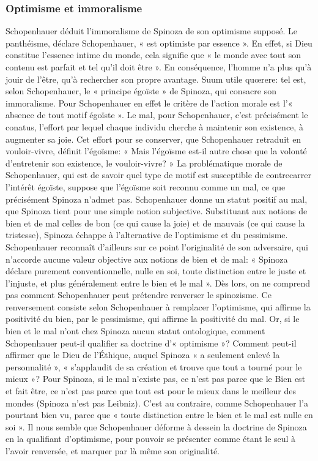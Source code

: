 \subsubsection{Optimisme et immoralisme}

Schopenhauer déduit l’immoralisme de Spinoza de son optimisme supposé. Le panthéisme, déclare
Schopenhauer, « est optimiste par essence ». En effet, si Dieu constitue l’essence intime
du monde, cela signifie que « le monde avec tout son contenu est parfait et tel qu’il doit être ». En conséquence, l’homme n’a plus qu’à jouir de l’être, qu’à rechercher son propre avantage.
Suum utile quœrere: tel est, selon Schopenhauer, le « principe égoïste » de Spinoza, qui
consacre son immoralisme. Pour Schopenhauer en effet le critère de l’action morale est l’« absence de tout
motif égoïste ».
Le mal, pour Schopenhauer, c’est précisément le conatus, l’effort par lequel chaque individu cherche à
maintenir son existence, à augmenter sa joie. Cet effort pour se conserver, que Schopenhauer retraduit en
vouloir-vivre, définit l’égoïsme: « Mais l’égoïsme est-il autre chose que la volonté d’entretenir son existence,
le vouloir-vivre? » La problématique morale de Schopenhauer, qui est de savoir quel type de motif est
susceptible de contrecarrer l’intérêt égoïste, suppose que l’égoïsme soit reconnu comme un mal, ce que
précisément Spinoza n’admet pas. Schopenhauer donne un statut positif au mal, que Spinoza tient pour une
simple notion subjective. Substituant aux notions de bien et de mal celles de bon (ce qui cause la joie) et de
mauvais (ce qui cause la tristesse), Spinoza échappe à l’alternative de l’optimisme et du pessimisme.
Schopenhauer reconnaît d’ailleurs sur ce point l’originalité de son adversaire, qui n’accorde aucune valeur
objective aux notions de bien et de mal: « Spinoza déclare purement conventionnelle, nulle en soi, toute
distinction entre le juste et l’injuste, et plus généralement entre le bien et le mal ».
Dès lors, on ne comprend pas comment Schopenhauer peut prétendre renverser le spinozisme. Ce
renversement consiste selon Schopenhauer à remplacer l’optimisme, qui affirme la positivité du bien, par le
pessimisme, qui affirme la positivité du mal. Or, si le bien et le mal n’ont chez Spinoza
aucun statut ontologique, comment Schopenhauer peut-il qualifier sa doctrine d’« optimisme »? Comment
peut-il affirmer que le Dieu de l’Éthique, auquel Spinoza « a seulement enlevé la personnalité »,
« s’applaudit de sa création et trouve que tout a tourné pour le mieux »? Pour Spinoza, si le mal
n’existe pas, ce n’est pas parce que le Bien est et fait être, ce n’est pas parce que tout est pour le mieux dans
le meilleur des mondes (Spinoza n’est pas Leibniz). C’est au contraire, comme Schopenhauer l’a pourtant
bien vu, parce que « toute distinction entre le bien et le mal est nulle en soi ».
Il nous semble que Schopenhauer déforme à dessein la doctrine de Spinoza en la qualifiant d’optimisme,
pour pouvoir se présenter comme étant le seul à l’avoir renversée, et marquer par là même son originalité.

